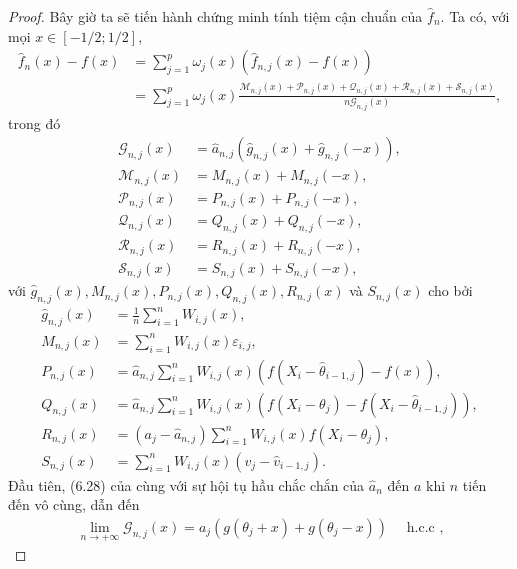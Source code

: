 \begin{proof}
Bây giờ ta sẽ tiến hành chứng minh tính tiệm cận chuẩn của $\widehat{f}_{n}$. Ta có, với mọi $x \in[-1 / 2 ; 1 / 2]$,
\begin{align}
    \widehat{f}_{n}(x)-f(x) & =\sum_{j=1}^{p} \omega_{j}(x)\left(\widehat{f}_{n, j}(x)-f(x)\right) \\
& =\sum_{j=1}^{p} \omega_{j}(x) \frac{\mathcal{M}_{n, j}(x)+\mathcal{P}_{n, j}(x)+\mathcal{Q}_{n, j}(x)+\mathcal{R}_{n, j}(x)+\mathcal{S}_{n, j}(x)}{n \mathcal{G}_{n, j}(x)},
\label{9.5}
\end{align}
trong đó
$$
\begin{aligned}
\mathcal{G}_{n, j}(x) & =\widehat{a}_{n, j}\left(\widehat{g}_{n, j}(x)+\widehat{g}_{n, j}(-x)\right), \\
\mathcal{M}_{n, j}(x) & =M_{n, j}(x)+M_{n, j}(-x), \\
\mathcal{P}_{n, j}(x) & =P_{n, j}(x)+P_{n, j}(-x), \\
\mathcal{Q}_{n, j}(x) & =Q_{n, j}(x)+Q_{n, j}(-x), \\
\mathcal{R}_{n, j}(x) & =R_{n, j}(x)+R_{n, j}(-x), \\
\mathcal{S}_{n, j}(x) & =S_{n, j}(x)+S_{n, j}(-x),
\end{aligned}
$$
với $\widehat{g}_{n, j}(x), M_{n, j}(x), P_{n, j}(x), Q_{n, j}(x), R_{n, j}(x)$ và $S_{n, j}(x)$ cho bởi
$$
\begin{aligned}
\widehat{g}_{n, j}(x) & =\frac{1}{n} \sum_{i=1}^{n} W_{i, j}(x), \\
M_{n, j}(x) & =\sum_{i=1}^{n} W_{i, j}(x) \varepsilon_{i, j}, \\
P_{n, j}(x) & =\widehat{a}_{n, j} \sum_{i=1}^{n} W_{i, j}(x)\left(f\left(X_{i}-\widehat{\theta}_{i-1, j}\right)-f(x)\right), \\
Q_{n, j}(x) & =\widehat{a}_{n, j} \sum_{i=1}^{n} W_{i, j}(x)\left(f\left(X_{i}-\theta_{j}\right)-f\left(X_{i}-\widehat{\theta}_{i-1, j}\right)\right), \\
R_{n, j}(x) & =\left(a_{j}-\widehat{a}_{n, j}\right) \sum_{i=1}^{n} W_{i, j}(x) f\left(X_{i}-\theta_{j}\right), \\
S_{n, j}(x) & =\sum_{i=1}^{n} W_{i, j}(x)\left(v_{j}-\widehat{v}_{i-1, j}\right) .
\end{aligned}
$$
Đầu tiên, (6.28) của \cite{bercu} cùng với sự hội tụ hầu chắc chắn của $\widehat{a}_{n}$ đến $a$ khi $n$ tiến đến vô cùng, dẫn đến
\begin{align}
    \lim _{n \rightarrow+\infty} \mathcal{G}_{n, j}(x)=a_{j}\left(g\left(\theta_{j}+x\right)+g\left(\theta_{j}-x\right)\right) \quad \text { h.c.c ,}

\end{align}
\end{proof}
